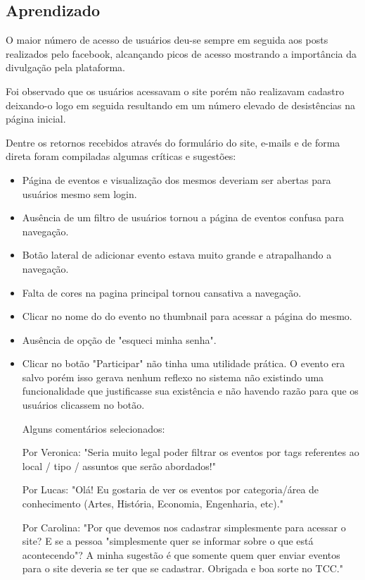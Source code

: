 \subsection{Aprendizado}
\par  O maior número de acesso de usuários deu-se sempre em seguida aos posts realizados pelo facebook, alcançando picos de acesso mostrando a importância da divulgação pela plataforma.
\par Foi observado que os usuários acessavam o site porém não realizavam cadastro deixando-o logo em seguida resultando em um número elevado de desistências na página inicial. 
\par Dentre os retornos recebidos através do formulário do site, e-mails e de forma direta foram compiladas algumas críticas e sugestões:
\begin{itemize}
\item Página de eventos e visualização dos mesmos deveriam ser abertas para usuários mesmo sem login.
\item Ausência de um filtro de usuários tornou a página de eventos confusa para navegação.
\item Botão lateral de adicionar evento estava muito grande e atrapalhando a navegação.
\item Falta de cores na pagina principal tornou cansativa a navegação.
\item Clicar no nome do do evento no thumbnail para acessar a página do mesmo.
\item Ausência de opção de "esqueci minha senha".
\item Clicar no botão "Participar" não tinha uma utilidade prática. O evento era salvo porém isso gerava nenhum reflexo no sistema não existindo uma funcionalidade que justificasse sua existência e não havendo razão para que os usuários clicassem no botão.
\par Alguns comentários selecionados:

\par Por Veronica: "Seria muito legal poder filtrar os eventos por tags referentes ao local / tipo / assuntos que serão abordados!"

\par Por Lucas: "Olá! Eu gostaria de ver os eventos por categoria/área de conhecimento (Artes, História, Economia, Engenharia, etc)."

\par Por Carolina: "Por que devemos nos cadastrar simplesmente para acessar o site? E se a pessoa "simplesmente quer se informar sobre o que está acontecendo"? A minha sugestão é que somente quem quer enviar eventos para o site deveria se ter que se cadastrar. Obrigada e boa sorte no TCC."


\end{itemize}

